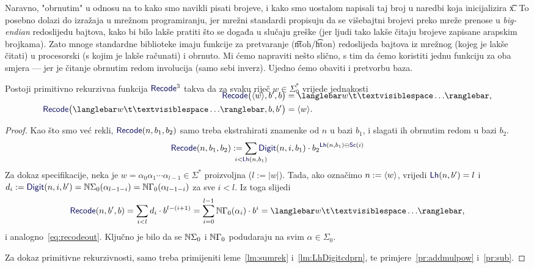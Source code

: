 Naravno, "obrnutim" u odnosu na to kako smo navikli pisati brojeve, i kako smo uostalom napisali taj broj u naredbi koja inicijalizira \t x. To posebno dolazi do izražaja u mrežnom programiranju, jer mrežni standardi propisuju da se višebajtni brojevi preko mreže prenose u \emph{big-endian} redoslijedu bajtova, kako bi bilo lakše pratiti što se događa u slučaju greške (jer ljudi tako lakše čitaju brojeve zapisane arapskim brojkama). Zato mnoge standardne biblioteke imaju funkcije za pretvaranje (\t{ntoh}/\t{hton}) redoslijeda bajtova iz mrežnog (kojeg je lakše čitati) u procesorski (s kojim je lakše računati) i obrnuto. Mi ćemo napraviti nešto slično, s tim da ćemo koristiti jednu funkciju za oba smjera --- jer je čitanje obrnutim redom involucija (samo sebi inverz). Ujedno ćemo obaviti i pretvorbu baza.

\begin{lema}\label{lm:recodeprn}
Postoji primitivno rekurzivna funkcija $\f{Recode}^3$ takva da za svaku riječ $w\in\Sigma_0^*$ vrijede jednakosti
\begin{align}
\SwapAboveDisplaySkip
    \label{eq:recodein}\f{Recode}\bigl(\kr w,b',b\bigr)&=\knk{w\bl\ldots}\text,\\
    \label{eq:recodeout}\f{Recode}\bigl(\knk{w\bl\ldots},b,b'\bigr)&=\kr w\text.
\end{align}
\end{lema}
\begin{proof}
Kao što smo već rekli, $\f{Recode}(n,b_1,b_2)$ samo treba ekstrahirati znamenke od $n$ u bazi $b_1$, i slagati ih obrnutim redom u bazi $b_2$.
\begin{equation}
    \f{Recode}(n,b_1,b_2):=\sum_{\mathclap{i<\f{Lh}(n,b_1)}}\f{Digit}(n,i,b_1)\cdot{b_2}^{\f{Lh}(n,b_1)\ominus\f{Sc}(i)}
\end{equation}
Za dokaz specifikacije, neka je $w=\alpha_0\alpha_1\dotsm\alpha_{l-1}\in\Sigma^*$ proizvoljna ($l:=\left|w\right|$). Tada, ako označimo $n:=\langle w\rangle$, vrijedi $\f{Lh}(n,b')=l$ i $d_i:=\f{Digit}(n,i,b')=\N\Sigma_0(\alpha_{l-1-i})=\N\Gamma_0(\alpha_{l-1-i})$ za sve $i<l$. Iz toga slijedi
\begin{equation}
    \f{Recode}(n,b',b)=\sum_{i<l}d_i\cdot b^{l-(i+1)}=\sum_{i=0}^{l-1}\N\Gamma_0(\alpha_i)\cdot b^i=\knk{w\bl\ldots}\text,
\end{equation}
i analogno~\eqref{eq:recodeout}. Ključno je bilo da se ${\mathbb N}\Sigma_0$ i ${\mathbb N}\Gamma_0$ podudaraju na svim $\alpha\in\Sigma_0$.

Za dokaz primitivne rekurzivnosti, samo treba primijeniti leme~\ref{lm:sumrek} i~\ref{lm:LhDigitcdprn}, te primjere~\ref{pr:addmulpow} i~\ref{pr:sub}.
\end{proof}

